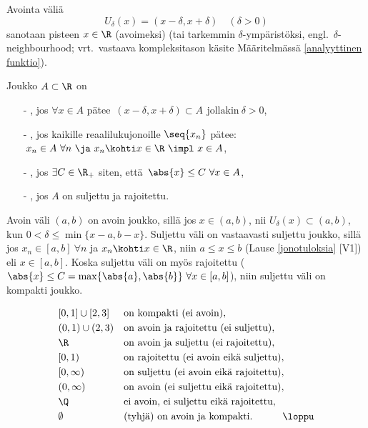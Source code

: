 Avointa väliä
\[ 
U_{\delta}(x) = (x-\delta,x+\delta) \quad (\delta>0)
\] 
%
sanotaan pisteen $x \in \R$ (avoimeksi)  (tai tarkemmin 
$\delta$-ympäristöksi, engl.\ $\delta$-neighbourhood; vrt.\ vastaava kompleksitason käsite
Määritelmässä \ref{analyyttinen funktio}).
\begin{Def} \label{avoimet ym. joukot}
  
Joukko $A\subset\R$ on
\begin{itemize}
\item[-] , jos $\forall x \in A$ pätee
         $\,(x-\delta,x+\delta)\subset A\,\ \text{jollakin}\ \delta>0$,
\item[-] , jos kaikille reaalilukujonoille $\seq{x_n}$ pätee: \newline
         $\,x_n \in A\ \forall n\ \ja\ x_n\kohti x\in\R\ \impl\ x\in A$,
\item[-] , jos $\exists C\in\R_+$ siten, että 
         $\,\abs{x} \le C\ \forall x \in A$,
\item[-] , jos $A$ on suljettu ja rajoitettu.
\end{itemize}
\end{Def}
\begin{Exa} Avoin väli $(a,b)$ on avoin joukko, sillä jos $x\in(a,b)$, nii
$U_\delta(x)\subset(a,b)$, kun $0<\delta\le\min\{x-a,b-x\}$. Suljettu väli on vastaavasti
suljettu joukko, sillä jos $x_n\in[a,b]\ \forall n$ ja $x_n \kohti x\in\R$, niin
$a \le x \le b$ (Lause \ref{jonotuloksia} [V1]) eli $x\in[a,b]$. Koska suljettu väli on myös
rajoitettu ($\abs{x} \le C = \max\{\abs{a},\abs{b}\}\ \forall x\in[a,b]$), niin suljettu
väli on kompakti joukko. \loppu
\end{Exa}
\begin{Exa}
\[
\begin{array}{ll}
\left[0,1\right] \cup [2,3]   &\text{on kompakti (ei avoin)}, \\[1mm]
(0,1) \cup (2,3)              &\text{on avoin ja rajoitettu (ei suljettu)}, \\[1mm]
\R                            &\text{on avoin ja suljettu (ei rajoitettu)}, \\[1mm]
[0,1)                         &\text{on rajoitettu (ei avoin eikä suljettu)}, \\[1mm]
\left[0,\infty\right)         &\text{on suljettu (ei avoin eikä rajoitettu)}, \\[1mm]
(0,\infty)                    &\text{on avoin (ei suljettu eikä rajoitettu)}, \\[1mm]
\Q                            &\text{ei avoin, ei suljettu eikä rajoitettu}, \\[1mm]
\emptyset                     &\text{(tyhjä) on avoin ja kompakti}. \qquad\quad\loppu
\end{array}
\]
\end{Exa}

